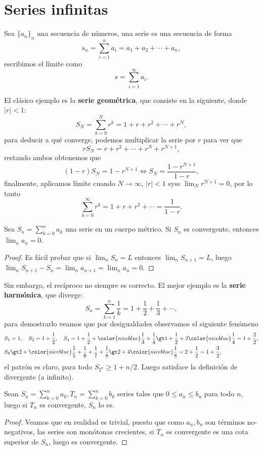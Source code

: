 \documentclass[11pt,oneside,a4paper]{book}
\begin{document}
\section{Series infinitas}
\begin{mydef}[Serie]
Sea $\{a_n\}_n$ una secuencia de números, una serie es una secuencia de forma
$$s_n=\sum_{i=1}^n a_i=a_1+a_2+\cdots+a_n,$$
escribimos el límite como
$$s=\sum_{i=1}^\infty a_i.$$
\end{mydef}
El clásico ejemplo es la \textbf{serie geométrica}, que consiste en la siguiente, donde $|r|\lt 1$:
$$S_N=\sum_{k=0}^N r^k=1+r+r^2+\cdots+r^N,$$
para deducir a qué converge, podemos multiplicar la serie por $r$ para ver que
$$rS_N=r+r^2+\cdots+r^N+r^{N+1},$$
restando ambos obtenemos que
$$(1-r)S_N=1-r^{N+1}\iff S_N=\frac{1-r^{N+1}}{1-r},$$
finalmente, aplicamos límite cuando $N\to\infty$, $|r|\lt 1$ syss $\lim_N r^{N+1}=0$, por lo tanto
\begin{equation}
\sum_{k=0}^\infty r^k=1+r+r^2+\cdots=\frac{1}{1-r}.
\end{equation}
\begin{thm}
Sea $S_n=\sum_{k=0}^na_k$ una serie en un cuerpo métrico. Si $S_n$ es convergente, entonces $\lim_n a_n=0$.
\end{thm}
\begin{proof}
Es fácil probar que si $\lim_n S_n=L$ entonces $\lim_n S_{n+1}=L$, luego $\lim_n S_{n+1}-S_n=\lim_n a_{n+1}=\lim_n a_n=0$.
\end{proof}
Sin embargo, el recíproco no siempre es correcto. El mejor ejemplo es la \textbf{serie harmónica}, que diverge:
$$S_n=\sum_{k=1}^n\frac{1}{k}=1+\frac 12+\frac 13+\cdots,$$
para demostrarlo veamos que por desigualdades observamos el siguiente fenómeno
\begin{align*}
&S_1=1,\quad S_2=1+\frac{1}{2},\quad S_4=1+\frac{1}{2}+{\color{niceblue}\frac{1}{3}+\frac 14}\gt 1+\frac 12+2{\color{niceblue}\frac 14}=1+\frac{2}{2},\\
&S_8\gt 2+{\color{niceblue}\frac 15+\frac 16+\frac 17+\frac 18}\gt 2+4{\color{niceblue}\frac 18}=2+\frac 12=1+\frac{3}{2},
\end{align*}
el patrón es claro, para todo $S_{2^n}\geq 1+n/2$. Luego satisface la definición de divergente (a infinito).
\begin{thm}
Sean $S_n=\sum^n_{k=0}a_k,T_n=\sum^n_{k=0}b_k$ series tales que $0\leq a_n\leq b_n$ para todo $n$, luego si $T_n$ es convergente, $S_n$ lo es.
\end{thm}
\begin{proof}
Veamos que en realidad es trivial, puesto que como $a_n,b_n$ son términos no-negativos, las series son monótonas crecientes, si $T_n$ es convergente es una cota superior de $S_n$, luego es convergente.
\end{proof}
\end{document}
